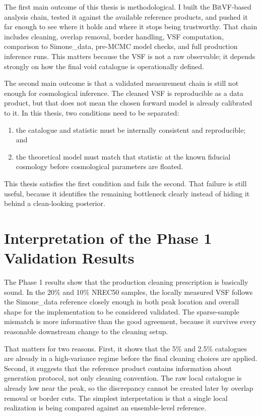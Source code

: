 \documentclass[12pt]{report}
\begin{document}
The first main outcome of this thesis is methodological. I built the BitVF-based analysis chain, tested it against the available reference products, and pushed it far enough to see where it holds and where it stops being trustworthy. That chain includes cleaning, overlap removal, border handling, VSF computation, comparison to Simone\_data, pre-MCMC model checks, and full production inference runs. This matters because the VSF is not a raw observable; it depends strongly on how the final void catalogue is operationally defined.

The second main outcome is that a validated measurement chain is still not enough for cosmological inference. The cleaned VSF is reproducible as a data product, but that does not mean the chosen forward model is already calibrated to it. In this thesis, two conditions need to be separated:
\begin{enumerate}
    \item the catalogue and statistic must be internally consistent and reproducible; and
    \item the theoretical model must match that statistic at the known fiducial cosmology before cosmological parameters are floated.
\end{enumerate}
This thesis satisfies the first condition and fails the second. That failure is still useful, because it identifies the remaining bottleneck clearly instead of hiding it behind a clean-looking posterior.

\section{Interpretation of the Phase 1 Validation Results}

The Phase 1 results show that the production cleaning prescription is basically sound. In the 20\% and 10\% NREC50 samples, the locally measured VSF follows the Simone\_data reference closely enough in both peak location and overall shape for the implementation to be considered validated. The sparse-sample mismatch is more informative than the good agreement, because it survives every reasonable downstream change to the cleaning setup.

That matters for two reasons. First, it shows that the 5\% and 2.5\% catalogues are already in a high-variance regime before the final cleaning choices are applied. Second, it suggests that the reference product contains information about generation protocol, not only cleaning convention. The raw local catalogue is already low near the peak, so the discrepancy cannot be created later by overlap removal or border cuts. The simplest interpretation is that a single local realization is being compared against an ensemble-level reference.
\end{document}
